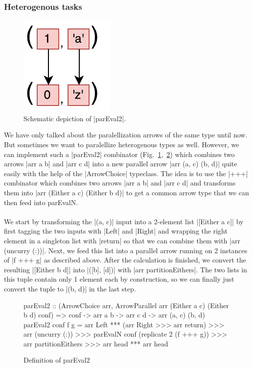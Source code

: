 \subsubsection{Heterogenous tasks}
\begin{figure}[h]
	\includegraphics[scale=0.7]{images/parEval2}
	\caption{Schematic depiction of |parEval2|.}
	\label{fig:parEval2Img}
\end{figure}
We have only talked about the paralellization arrows of the same type until now. But sometimes we want to paralellize heterogenous types as well. However, we can implement such a |parEval2| combinator (Fig.~\ref{fig:parEval2Img},~\ref{fig:parEval2}) which combines two arrows |arr a b| and |arr c d| into a new parallel arrow |arr (a, c) (b, d)| quite easily with the help of the |ArrowChoice| typeclass. The idea is to use the |+++| combinator which combines two arrows |arr a b| and |arr c d| and transforms them into |arr (Either a c) (Either b d)| to get a common arrow type that we can then feed into parEvalN.
\\\\
We start by transforming the |(a, c)| input into a 2-element list |[Either a c]| by first tagging the two inputs with |Left| and |Right| and wrapping the right element in a singleton list with |return| so that we can combine them with |arr (uncurry (:))|. Next, we feed this list into a parallel arrow running on 2 instances of |f +++ g| as described above. After the calculation is finished, we convert the resulting |[Either b d]| into |([b], [d])| with |arr partitionEithers|. The two lists in this tuple contain only 1 element each by construction, so we can finally just convert the tuple to |(b, d)| in the last step.
\begin{figure}[h]
\begin{code}
parEval2 :: (ArrowChoice arr,
	ArrowParallel arr (Either a c) (Either b d) conf) =>
	conf -> arr a b -> arr c d -> arr (a, c) (b, d)
parEval2 conf f g =
	arr Left *** (arr Right >>> arr return) >>>
	arr (uncurry (:)) >>>
	parEvalN conf (replicate 2 (f +++ g)) >>>
	arr partitionEithers >>>
	arr head *** arr head
\end{code}
	\caption{Definition of parEval2}
	\label{fig:parEval2}
\end{figure}


